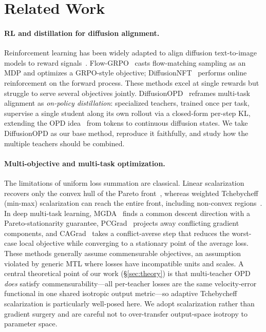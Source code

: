 \section{Related Work}
\label{sec:related}

\paragraph{RL and distillation for diffusion alignment.}
Reinforcement learning has been widely adapted to align diffusion text-to-image
models to reward signals~\cite{liu2025flow,zheng2025diffusionnft,schulman2017proximal}.
Flow-GRPO~\cite{liu2025flow} casts flow-matching sampling as an MDP and optimizes
a GRPO-style objective; DiffusionNFT~\cite{zheng2025diffusionnft} performs online
reinforcement on the forward process. These methods excel at single rewards but
struggle to serve several objectives jointly. DiffusionOPD~\cite{li2026diffusionopd}
reframes multi-task alignment as \emph{on-policy distillation}: specialized
teachers, trained once per task, supervise a single student along its own rollout
via a closed-form per-step KL, extending the OPD idea~\cite{thinkingmachines2026opd}
from tokens to continuous diffusion states. We take DiffusionOPD as our base
method, reproduce it faithfully, and study how the multiple teachers should be
combined.

\paragraph{Multi-objective and multi-task optimization.}
The limitations of uniform loss summation are classical. Linear scalarization
recovers only the convex hull of the Pareto front~\cite{miettinen1999nonlinear,boyd2004convex},
whereas weighted Tchebycheff (min-max) scalarization can reach the entire front,
including non-convex regions~\cite{miettinen1999nonlinear}. In deep multi-task
learning, MGDA~\cite{sener2018multi,desideri2012mgda} finds a common descent
direction with a Pareto-stationarity guarantee, PCGrad~\cite{yu2020gradient}
projects away conflicting gradient components, and CAGrad~\cite{liu2021conflict}
takes a conflict-averse step that reduces the worst-case local objective while
converging to a stationary point of the average loss. These methods generally
assume commensurable objectives, an assumption violated by generic MTL where
losses have incompatible units and scales. A central theoretical point of our
work (\S\ref{sec:theory}) is that multi-teacher OPD \emph{does} satisfy
commensurability---all per-teacher losses are the same velocity-error functional
in one shared isotropic output metric---so adaptive Tchebycheff scalarization is
particularly well-posed here. We adopt scalarization rather than gradient surgery
and are careful not to over-transfer output-space isotropy to parameter space.

